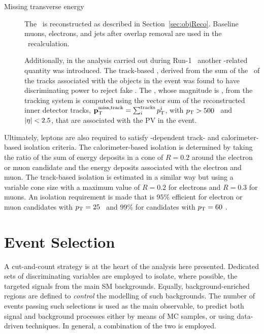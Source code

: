 \begin{description}
			\item[Missing transverse energy]
				The \met\ is reconstructed as described in Section~\ref{sec:objReco}. Baseline muons, electrons, and jets after overlap removal are used in the \met\ recalculation. 

				Additionally, in the analysis carried out during Run-1~\cite{stop0LRun1} another \met-related quantity was introduced. The track-based \met, derived from the sum of the \pt\ of the tracks associated with the objects in the event was found to have discriminating power to reject fake \met. The \ptmisstrk, whose magnitude is \mettrk, from the tracking system is computed using the vector sum of the reconstructed inner detector tracks, $\mathbf{p}_{\mathrm{T}}^{\mathrm{miss, track}} = \sum_i^{\mathrm{tracks}} p_{\mathrm{T}}^i$, with $p_{\mathrm{T}} > 500$ \MeV\ and $|\eta| < 2.5$, that are associated with the \ac{PV} in the event. 
 		\end{description}

		Ultimately, leptons are also required to satisfy \pt-dependent track- and calorimeter-based isolation criteria. The calorimeter-based isolation is determined by taking the ratio of the sum of energy deposits in a cone of $R = 0.2$ around the electron or muon candidate and the energy deposits associated with the electron and muon. The track-based isolation is estimated in a similar way but using a variable cone size with a maximum value of $R = 0.2$ for electrons and $R = 0.3$ for muons. An isolation requirement is made that is $95\%$ efficient for electron or muon candidates with $p_{\mathrm{T}} = 25$ \GeV\ and $99\%$ for candidates with $p_{\mathrm{T}} = 60$ \GeV.


	\section{Event Selection}
	\label{sec:evtsel}

		A cut-and-count strategy is at the heart of the analysis here presented. Dedicated sets of discriminating variables are employed to isolate, where possible, the targeted signals from the main \ac{SM} backgrounds. Equally, background-enriched regions are defined to \emph{control} the modelling of such backgrounds. The number of events passing such selections is used as the main observable, to predict both signal and background processes either by means of \ac{MC} samples, or using data-driven techniques. In general, a combination of the two is employed. 

